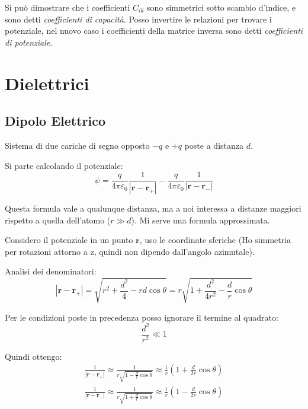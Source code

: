 \documentclass[a4paper]{scrarticle}
\begin{document}
Si può dimostrare che i coefficienti $C_{ik}$ sono simmetrici sotto scambio d'indice, e sono detti \emph{coefficienti di capacità}.
Posso invertire le relazioni per trovare i potenziale, nel nuovo caso i coefficienti della matrice inversa sono detti \emph{coefficienti di potenziale}.


\section {Dielettrici}

\subsection{Dipolo Elettrico}

Sistema di due cariche di segno opposto $-q$ e $+q$ poste a distanza $d$.

Si parte calcolando il potenziale:
\begin{equation*}
    \psi = \frac{q}{4\pi\varepsilon_0} \frac{1}{\left|\bm r - \bm r_+\right|} - \frac{q}{4\pi\varepsilon_0} \frac{1}{\left|\bm r - \bm r_-\right|}
\end{equation*}

Questa formula vale a qualunque distanza, ma a noi interessa a distanze maggiori rispetto a quella dell'atomo ($r \gg d$). Mi serve una formula approssimata.

Considero il potenziale in un punto $\bm r$, uso le coordinate sferiche (Ho simmetria per rotazioni attorno a z, quindi non dipendo dall'angolo azimutale).

Analisi dei denominatori:
\begin{equation*}
    \left|\bm r - \bm r_+\right|= \sqrt{r^2 + \frac{d^2}{4} - rd \cos \theta} = r \sqrt{1 + \frac{d^2}{4r^2} - \frac{d}{r}\cos \theta}
\end{equation*}

Per le condizioni poste in precedenza posso ignorare il termine al quadrato:
\begin{equation*}
    \frac{d^2}{r^2} \ll 1
\end{equation*}

Quindi ottengo:
\begin{gather}
    \frac{1}{\left|\bm r - \bm r_+\right|} \approx \frac{1}{r \sqrt{1 - \frac{d}{r}\cos \theta}} \approx \frac{1}{r}(1 + \frac{d}{2r}\cos \theta)\\
    \frac{1}{\left|\bm r - \bm r_-\right|} \approx \frac{1}{r \sqrt{1 + \frac{d}{r}\cos \theta}} \approx \frac{1}{r}(1 - \frac{d}{2r}\cos \theta)
\end{gather}
\end{document}
